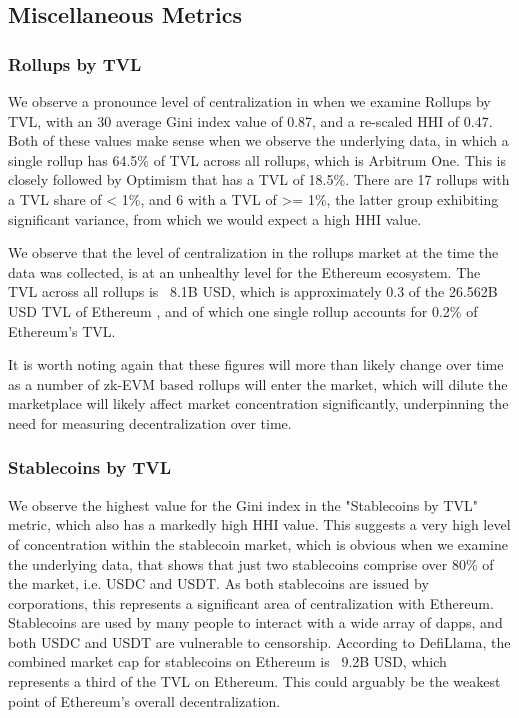 \documentclass[conference]{IEEEtran}
\begin{document}
\subsection{Miscellaneous Metrics}

\subsubsection{Rollups by TVL}

We observe a pronounce level of centralization in when we examine Rollups by TVL, with an 30 average Gini index value of 0.87, and a re-scaled HHI of 0.47.  Both of these values make sense when we observe the underlying data, in which a single rollup has 64.5\% of TVL across all rollups, which is Arbitrum One.  This is closely followed by Optimism that has a TVL of 18.5\%.  There are 17 rollups with a TVL share of < 1\%, and 6 with a TVL of >= 1\%, the latter group exhibiting significant variance, from which we would expect a high HHI value.

We observe that the level of centralization in the rollups market at the time the data was collected, is at an unhealthy level for the Ethereum ecosystem.  The TVL across all rollups is ~8.1B USD, which is approximately 0.3 of the 26.562B USD TVL of Ethereum \cite{defillama}, and of which one single rollup accounts for 0.2\% of Ethereum's TVL.

It is worth noting again that these figures will more than likely change over time as a number of zk-EVM based rollups will enter the market, which will dilute the marketplace will likely affect market concentration significantly, underpinning the need for measuring decentralization over time.

\subsubsection{Stablecoins by TVL}

We observe the highest value for the Gini index in the "Stablecoins by TVL" metric, which also has a markedly high HHI value.  This suggests a very high level of concentration within the stablecoin market, which is obvious when we examine the underlying data, that shows that just two stablecoins comprise over 80\% of the market, i.e. USDC and USDT. As both stablecoins are issued by corporations, this represents a significant area of centralization with Ethereum.  Stablecoins are used by many people to interact with a wide array of dapps, and both USDC and USDT are vulnerable to censorship.  According to DefiLlama\cite{defillama}, the combined market cap for stablecoins on Ethereum is ~9.2B USD, which represents a third of the TVL on Ethereum.  This could arguably be the weakest point of Ethereum's overall decentralization.
\end{document}

